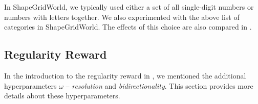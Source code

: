 In ShapeGridWorld, we typically used either a set of all single-digit numbers or numbers with letters together.
We also experimented with the above list of categories in ShapeGridWorld.
The effects of this choice are also compared in .


\newpage
\subsection{Regularity Reward}
\label{sec:regularity-reward-details}

In the introduction to the regularity reward in , we mentioned the additional hyperparameters \(\omega\) -- \emph{resolution} and \emph{bidirectionality}.
This section provides more details about these hyperparameters.

